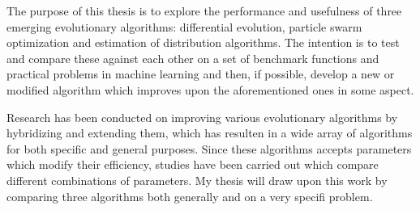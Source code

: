 The purpose of this thesis is to explore the performance and usefulness of three emerging evolutionary algorithms: differential evolution, particle swarm optimization and estimation of distribution algorithms. The intention is to test and compare these against each other on a set of benchmark functions and practical problems in machine learning and then, if possible, develop a new or modified algorithm which improves upon the aforementioned ones in some aspect.

Research has been conducted on improving various evolutionary algorithms by hybridizing and extending them, which has resulten in a wide array of algorithms for both specific and general purposes. Since these algorithms accepts parameters which modify their efficiency, studies have been carried out which compare different combinations of parameters. My thesis will draw upon this work by comparing three algorithms both generally and on a very specifi problem.
